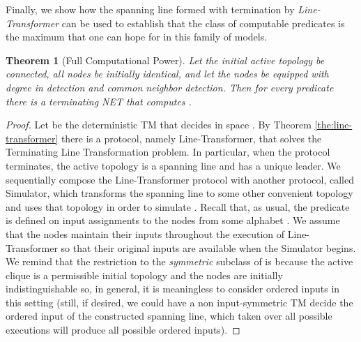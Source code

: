 \documentclass[preprint]{elsarticle}
\newtheorem{theorem}{Theorem}
\begin{document}
Finally, we show how the spanning line formed with termination by \emph{Line-Transformer} can be used to establish that the class of computable predicates is the maximum that one can hope for in this family of models.

\begin{theorem} [Full Computational Power]
Let the initial active topology be connected, all nodes be initially identical, and let the nodes be equipped with degree in  detection and common neighbor detection. Then for every predicate  there is a terminating NET that computes .  
\end{theorem}
\begin{proof}
Let  be the deterministic TM that decides  in space . By Theorem \ref{the:line-transformer} there is a protocol, namely Line-Transformer, that solves the Terminating Line Transformation problem. In particular, when the protocol terminates, the active topology is a spanning line and has a unique leader. We sequentially compose the Line-Transformer protocol with another protocol, called Simulator, which transforms the spanning line to some other convenient topology and uses that topology in order to simulate . Recall that, as usual, the predicate  is defined on input assignments to the nodes from some alphabet . We assume that the nodes maintain their inputs throughout the execution of Line-Transformer so that their original inputs are available when the Simulator begins. We remind that the restriction to the \emph{symmetric} subclass of  is because the active clique is a permissible initial topology and the nodes are initially indistinguishable so, in general, it is meaningless to consider ordered inputs in this setting (still, if desired, we could have a non input-symmetric TM decide the ordered input of the constructed spanning line, which taken over all possible executions will produce all possible ordered inputs).


\end{proof}
\end{document}
